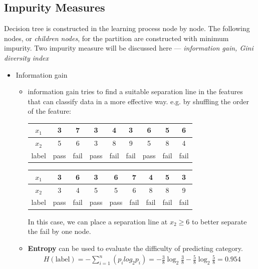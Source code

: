 \documentclass[a4paper,10pt]{article}
\begin{document}
\subsection{Impurity Measures}
Decision tree is constructed in the learning process node by node. The following nodes, or \textit{children nodes}, for the partition are constructed with minimum impurity. Two impurity measure will be discussed here --- \textit{information gain, Gini diversity index}
\begin{itemize}
    \item Information gain
        \begin{itemize}
            \item information gain tries to find a suitable separation line in the features that can classify data in a more effective way. e.g. by shuffling the order of the feature:
            \begin{table}[hbt]
                \centering
                \begin{tabular}{|c|c|c|c|c|c|c|c|c|}
                \hline
                $x_1$ & 3 & 7 & 3 & 4 & 3 & 6 & 5 & 6 \\ \hline
                $x_2$ & 5 & 6 & 3 & 8 & 9 & 5 & 8 & 4 \\ \hline
                label & pass & fail & pass & fail & fail & pass & fail & fail \\ \hline
                \end{tabular}
            \end{table}
            \begin{table}[hbt]
                \centering
                \begin{tabular}{|c|c|c|c|c||c|c|c|c|}
                \hline
                $x_1$ & 3 & 6 & 3 & 6 & 7 & 4 & 5 & 3 \\ \hline
                $x_2$ & 3 & 4 & 5 & 5 & 6 & 8 & 8 & 9 \\ \hline
                label & pass & fail & pass & pass & fail & fail & fail & fail \\ \hline
                \end{tabular}
            \end{table}
            In this case, we can place a separation line at $x_2\geq6$ to better separate the fail by one node. 
            \item \textbf{Entropy} can be used to evaluate the difficulty of predicting category.
            \begin{gather*}
                H(\text{label}) = -\sum_{i = 1}^{n}(p_i log_2p_i) = -\frac{3}{8}\log_2\frac{3}{8}-\frac{5}{8}\log_2\frac{5}{8} = 0.954

\end{gather*}
\end{itemize}
\end{itemize}
\end{document}
